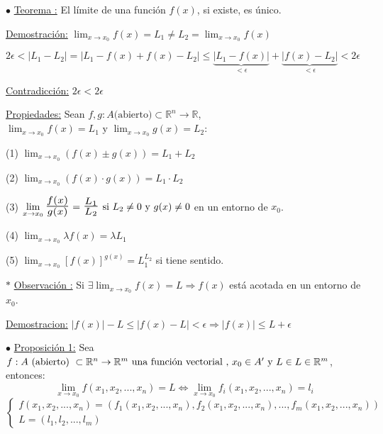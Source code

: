 \documentclass[10pt, titlepage]{article}
\newcommand{\R}{\mathbb{R}}
\newcommand{\bfrac}[2]{\scalebox{1.4}{$\frac{#1}{#2}$}}
\newcommand{\teorema}[1][\!\!]{\noindent$\bullet$ \underline{Teorema #1:} }
\newcommand{\proposicion}[1][\!\!]{\noindent$\bullet$ \underline{Proposición #1:} }
\newcommand{\observacion}[1][\!\!]{\noindent$\ast$ \underline{Observación #1:} }
\newcommand{\dindent}{\indent\indent}
\begin{document}
\teorema El límite de una función $f (x)$, si existe, es único.
\vspace{5mm}

\underline{Demostración:} $\displaystyle \lim_{x \to x_0} f (x) = L_1 \neq L_2 = \lim_{x \to x_0} f (x)$
\vspace{3mm}

\dindent$2 \epsilon < |L_1 - L_2| = |L_1 - f(x) + f(x) - L_2| \leq \underbrace{|L_1 - f(x)|}_{< \epsilon} + \underbrace{|f (x) - L_2|}_{< \epsilon} < 2 \epsilon$

\dindent\underline{Contradicción:} $2 \epsilon < 2 \epsilon$
\vspace{7mm}

\underline{Propiedades:} Sean $f, g : A \text{(abierto)} \subset \R^n \to \R$, $\displaystyle \lim_{x \to x_0} 
f (x) = L_1 \text{ y } \lim_{x \to x_0} g (x) = L_2$:
\vspace{3mm}

\dindent (1) $\displaystyle \lim_{x \to x_0} (f (x) \pm g (x)) = L_1 + L_2$
\vspace{3mm}

\dindent (2) $\displaystyle \lim_{x \to x_0} (f (x) \cdot g (x)) = L_1 \cdot L_2$
\vspace{3mm}

\dindent (3) $\displaystyle \lim_{x \to x_0} \bfrac{f (x)}{g (x)} = \bfrac{L_1}{L_2} \text{ si } L_2 \neq 0 
\text{ y } g (x) \neq 0$ en un entorno de $x_0$.
\vspace{3mm}

\dindent (4) $\displaystyle \lim_{x \to x_0} \lambda f (x) = \lambda L_1$
\vspace{3mm}

\dindent (5) $\displaystyle \lim_{x \to x_0} [f (x)]^{g (x)} = L_1^{L_2}$ si tiene sentido.
\vspace{7mm}

\observacion Si $\exists \displaystyle \lim_{x \to x_0} f (x) = L \Rightarrow f (x)$ está acotada en un entorno 
de $x_0$.
\vspace{5mm}

\underline{Demostracion:} $| f (x) | - L \leq |f (x) - L|< \epsilon \Rightarrow |f (x)| \leq L + \epsilon$
\vspace{7mm}

\proposicion[1] Sea $f : A \text{ (abierto) }  \subset \R^n \rightarrow \R^m \text{ una función 
vectorial , } \vspace{1mm} \\  x_0 \in A' \text{ y } L \in L \in \R^m$, entonces:
\[
\boxed{
\displaystyle \lim_{x \to x_0}^{} f (x_1, x_2,...,x_n) = L \iff \lim_{x \to x_0} f_i (x_1, x_2,..., x_n) = l_i
}
\]
\vspace{3mm}
\[
\left \{\begin{array}{lc}
f (x_1, x_2,...,x_n) = (f_1 (x_1, x_2,..., x_n), f_2 (x_1, x_2,..., x_n),..., f_m (x_1, x_2,..., x_n)) \\
L = (l_1, l_2,..., l_m)
\end{array}\right.
\]
\vspace{10mm}
\end{document}
